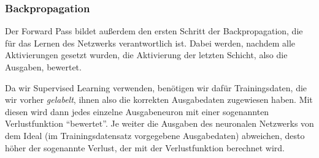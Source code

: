 \documentclass[10pt]{article}
\newcommand{\eng}[1]{\textit{#1}}
\begin{document}
\subsubsection{Backpropagation}

Der Forward Pass bildet außerdem den ersten Schritt der Backpropagation, die für das Lernen des Netzwerks verantwortlich ist.
Dabei werden, nachdem alle Aktivierungen gesetzt wurden, die Aktivierung der letzten Schicht, also die Ausgaben, bewertet.

Da wir Supervised Learning verwenden, benötigen wir dafür Trainingsdaten, die wir vorher \eng{gelabelt}, ihnen also die korrekten Ausgabedaten zugewiesen haben.
Mit diesen wird dann jedes einzelne Ausgabeneuron mit einer sogenannten Verlustfunktion \enquote{bewertet}.
Je weiter die Ausgaben des neuronalen Netzwerks von dem Ideal (im Trainingsdatensatz vorgegebene Ausgabedaten) abweichen, desto höher der sogenannte Verlust, der mit der Verlustfunktion berechnet wird.


        

        
        
\end{document}
